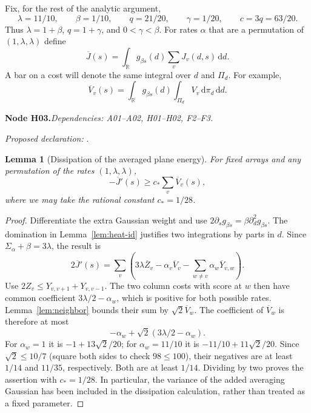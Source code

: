 \documentclass[11pt]{article}
\newtheorem{lemma}[theorem]{Lemma}
\theoremstyle{remark}\newtheorem{remark}[theorem]{Remark}
\newcommand{\R}{\mathbb R}\newcommand{\C}{\mathbb C}
\newcommand{\dd}{\,\mathrm d}\newcommand{\tr}{\operatorname{tr}}
\newcommand{\bpnode}[3]{\par\Needspace{5\baselineskip}\noindent\textbf{Node #1.}\quad\textit{Dependencies: #2.}\par\noindent\textit{Proposed declaration:} \texttt{\detokenize{#3}}.\par\smallskip}
\begin{document}
Fix, for the rest of the analytic argument,
\[
 \lambda=11/10,\qquad \beta=1/10,\qquad q=21/20,\qquad \gamma=1/20,
 \qquad c=3q=63/20.
\]
Thus $\lambda=1+\beta$, $q=1+\gamma$, and $0<\gamma<\beta$.
For rates $\alpha$ that are a permutation of $(1,\lambda,\lambda)$ define
\[
 \overline J(s)=\int_\R g_{\beta s}(d)\sum_vJ_v(d,s)\dd d.
\]
A bar on a cost will denote the same integral over $d$ and $\Pi_d$. For example,
\[
 \overline V_v(s)=\int_\R g_{\beta s}(d)\int_{\Pi_d}V_v\dd\pi_d\dd d.
\]

\bpnode{H03}{A01--A02, H01--H02, F2--F3}{smeared_plane_dissipation}
\begin{lemma}[Dissipation of the averaged plane energy]\label{lem:smeared}
For fixed arrays and any permutation of the rates $(1,\lambda,\lambda)$,
\[
 -\overline J'(s)\geq c_*\sum_v\overline V_v(s),
\]
where we may take the rational constant $c_*=1/28$.
\end{lemma}
\begin{proof}
Differentiate the extra Gaussian weight and use $2\partial_sg_{\beta s}=\beta\partial_d^2g_{\beta s}$. The domination in Lemma~\ref{lem:heat-id} justifies two integrations by parts in $d$. Since $\Sigma_\alpha+\beta=3\lambda$, the result is
\[
 2\overline J'(s)
 =\sum_v\left(3\lambda\overline Z_v-\alpha_v\overline V_v
                  -\sum_{w\ne v}\alpha_w\overline Y_{v,w}\right).
\]
Use $2Z_v\leq Y_{v,v+1}+Y_{v,v-1}$. The two column costs with score at $w$ then have common coefficient $3\lambda/2-\alpha_w$, which is positive for both possible rates. Lemma~\ref{lem:neighbor} bounds their sum by $\sqrt2\overline V_w$. The coefficient of $\overline V_w$ is therefore at most
\[
 -\alpha_w+\sqrt2(3\lambda/2-\alpha_w).
\]
For $\alpha_w=1$ it is $-1+13\sqrt2/20$; for $\alpha_w=11/10$ it is $-11/10+11\sqrt2/20$. Since $\sqrt2\le10/7$ (square both sides to check $98\le100$), their negatives are at least $1/14$ and $11/35$, respectively. Both are at least $1/14$. Dividing by two proves the assertion with $c_*=1/28$. In particular, the variance of the added averaging Gaussian has been included in the dissipation calculation, rather than treated as a fixed parameter.
\end{proof}
\end{document}
